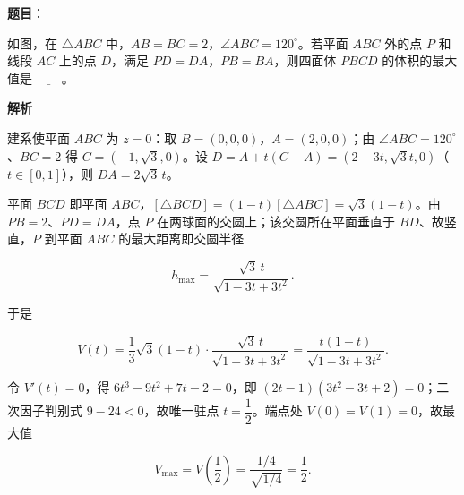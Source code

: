 \begin{answer}

\textbf{题目}：

如图，在 \(\triangle ABC\) 中，\(AB=BC=2\)，\(\angle ABC=120^{\circ}\)。若平面 \(ABC\) 外的点 \(P\) 和线段 \(AC\) 上的点 \(D\)，满足 \(PD=DA\)，\(PB=BA\)，则四面体 \(PBCD\) 的体积的最大值是 \(\underline{\qquad}\)。
\nopagebreak[4]
\begin{center}\end{center}
\nopagebreak[4]
\textbf{解析}

建系使平面 \(ABC\) 为 \(z=0\)：取 \(B=(0,0,0)\)，\(A=(2,0,0)\)；由 \(\angle ABC=120^{\circ}\)、\(BC=2\) 得 \(C=(-1,\sqrt{3},0)\)。设 \(D=A+t(C-A)=\left(2-3t,\sqrt{3}t,0\right)\)（\(t\in[0,1]\)），则 \(DA=2\sqrt{3}\,t\)。

平面 \(BCD\) 即平面 \(ABC\)，\([\triangle BCD]=(1-t)[\triangle ABC]=\sqrt{3}(1-t)\)。由 \(PB=2\)、\(PD=DA\)，点 \(P\) 在两球面的交圆上；该交圆所在平面垂直于 \(BD\)、故竖直，\(P\) 到平面 \(ABC\) 的最大距离即交圆半径

\nopagebreak[4]
\[
h_{\max}=\dfrac{\sqrt{3}\,t}{\sqrt{1-3t+3t^{2}}}.
\]

于是

\nopagebreak[4]
\[
V(t)=\dfrac{1}{3}\sqrt{3}(1-t)\cdot\dfrac{\sqrt{3}\,t}{\sqrt{1-3t+3t^{2}}}=\dfrac{t(1-t)}{\sqrt{1-3t+3t^{2}}}.
\]

令 \(V'(t)=0\)，得 \(6t^{3}-9t^{2}+7t-2=0\)，即 \((2t-1)(3t^{2}-3t+2)=0\)；二次因子判别式 \(9-24<0\)，故唯一驻点 \(t=\dfrac{1}{2}\)。端点处 \(V(0)=V(1)=0\)，故最大值

\nopagebreak[4]
\[
V_{\max}=V\left(\dfrac{1}{2}\right)=\dfrac{1/4}{\sqrt{1/4}}=\dfrac{1}{2}.
\]


\end{answer}
